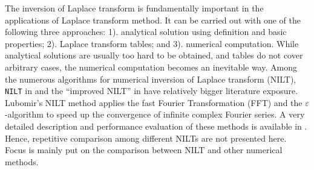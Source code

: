 \documentclass[11pt]{tCON2e}
\theoremstyle{plain}\newtheorem{theorem}{Theorem}
\theoremstyle{definition}
\theoremstyle{remark}
\begin{document}
The inversion of Laplace transform is fundamentally important in the applications of Laplace transform method. It can be carried out with one of the following three approaches: 1). analytical solution using definition and basic properties; 2). Laplace transform tables; and 3). numerical computation. While analytical solutions are usually too hard to be obtained, and tables do not cover arbitrary cases, the numerical computation becomes an inevitable way. Among the numerous algorithms for numerical inversion of Laplace transform (NILT), {\tt NILT} in \cite{ref:INVLAP_1982, ref:Liangjinsong_phd_thesis} and the ``improved NILT'' in \cite{ref:Lubomir_NILT1, ref:Lubomir_NILT_improved, ref:Lubomir_NILT} have relatively bigger literature exposure.
Lubomir's NILT method applies the fast Fourier Transformation (FFT) and the $\varepsilon$-algorithm to speed up the convergence of infinite complex Fourier series. A very detailed description and performance evaluation of these methods is available in \cite{ref:Shenghu_NILT}. Hence, repetitive comparison among different NILTs are not presented here. Focus is mainly put on the comparison between NILT and other numerical methods.
\end{document}
